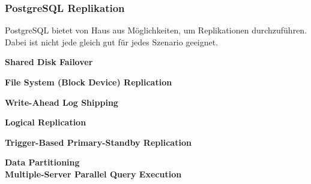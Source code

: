 
\subsubsection{\Gls{PostgreSQL} Replikation}
\begin{flushleft}
    PostgreSQL bietet von Haus aus Möglichkeiten, um Replikationen durchzuführen.
    Dabei ist nicht jede gleich gut für jedes Szenario geeignet\cite{FZAHA89U}.
\end{flushleft}
\begin{flushleft}
    \textbf{Shared Disk Failover}\\
\end{flushleft}
\begin{flushleft}
    \textbf{File System (Block Device) Replication}\\
\end{flushleft}
\begin{flushleft}
    \textbf{Write-Ahead Log Shipping}\\
\end{flushleft}
\begin{flushleft}
    \textbf{Logical Replication}\\
\end{flushleft}
\begin{flushleft}
    \textbf{Trigger-Based Primary-Standby Replication}\\
\end{flushleft}
\begin{flushleft}
    \textbf{Data Partitioning}\\
    \textbf{Multiple-Server Parallel Query Execution}\\
\end{flushleft}
\begin{flushleft}
    \textbf{}\\
\end{flushleft}
\begin{flushleft}
    \textbf{}\\
\end{flushleft}
\begin{flushleft}
    \textbf{}\\
\end{flushleft}
\begin{flushleft}
    \textbf{}\\
\end{flushleft}
\begin{flushleft}
    \textbf{}\\
\end{flushleft}